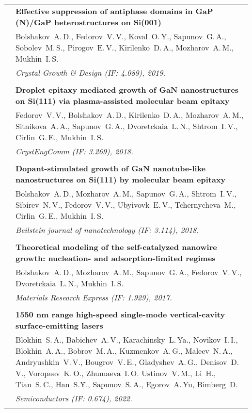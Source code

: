 \documentclass[letterpaper, 11pt]{article}
\begin{document}
\begin{longtable}{p{1.3in}p{4.8in}}
        & \textbf{Effective suppression of antiphase domains in GaP (N)/GaP
        heterostructures on Si(001)} \\
        & Bolshakov~A.\,D., Fedorov~V.\,V., Koval~O.\,Y., Sapunov~G.\,A.,
        Sobolev~M.\,S., Pirogov~E.\,V., Kirilenko~D.\,A., Mozharov~A.\,M.,
        Mukhin~I.\,S. \\
        & \textit{Crystal Growth \& Design (IF: 4.089), 2019.}\\
		& \\
		
        & \textbf{Droplet epitaxy mediated growth of GaN nanostructures on
        Si(111) via plasma-assisted molecular beam epitaxy} \\
        & Fedorov~V.\,V., Bolshakov~A.\,D., Kirilenko~D.\,A., Mozharov~A.\,M.,
        Sitnikova~A.\,A., Sapunov~G.\,A., Dvoretckaia~L.\,N., Shtrom~I.\,V.,
        Cirlin~G.\,E., Mukhin~I.\,S. \\
        & \textit{CrystEngComm (IF: 3.269), 2018.}\\
		& \\

        & \textbf{Dopant-stimulated growth of GaN nanotube-like nanostructures
        on Si(111) by molecular beam epitaxy} \\
        & Bolshakov~A.\,D., Mozharov~A.\,M., Sapunov~G.\,A., Shtrom~I.\,V.,
        Sibirev~N.\,V., Fedorov~V.\,V., Ubyivovk~E.\,V., Tchernycheva~M.,
        Cirlin~G.\,E., Mukhin~I.\,S. \\
        & \textit{Beilstein journal of nanotechnology (IF: 3.114), 2018.}\\
		& \\

		\nohyphens{\color{OliveGreen}{Q2 Publications}}
        & \textbf{Theoretical modeling of the self-catalyzed nanowire growth:
        nucleation- and adsorption-limited regimes} \\
        & Bolshakov~A.\,D., Mozharov~A.\,M., Sapunov~G.\,A., Fedorov~V.\,V.,
        Dvoretckaia~L.\,N., Mukhin~I.\,S. \\
        & \textit{Materials Research Express (IF: 1.929), 2017.}\\
		& \\

		\nohyphens{\color{OliveGreen}{Q3 Publications}}
        & \textbf{1550 nm range high-speed single-mode vertical-cavity
        surface-emitting lasers} \\
        & Blokhin~S.\,A., Babichev~A.\,V., Karachinsky~L.\,Ya., Novikov~I.\,I.,
        Blokhin~A.\,A., Bobrov~M.\,A., Kuzmenkov~A.\,G., Maleev~N.\,A.,
        Andryushkin~V.\,V., Bougrov~V.\,E., Gladyshev~A.\,G., Denisov~D.\,V.,
        Voropaev~K.\,O., Zhumaeva~I.\,O. Ustinov~V.\,M., Li~H., Tian~S.\,C.,
        Han~S.\.Y., Sapunov~S.\,A., Egorov~A.\,Yu, Bimberg~D. \\
		& \textit{Semiconductors (IF: 0.674), 2022.}\\
		& \\


\end{longtable}
\end{document}
